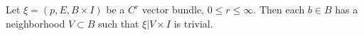 Let $\xi = (p, E, B \times I)$ be a $C^r$ vector bundle, $0 \leqslant r \leqslant \infty$. Then each $b \in B$ has a neighborhood $V \subset B$ such that $\xi|V \times I$ is trivial.
